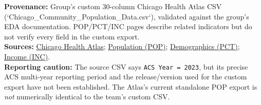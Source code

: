 \documentclass[10pt]{article}
\begin{document}
\begin{center}
  
\end{center}
\vspace{0.35em}
\noindent\begin{minipage}{0.96\linewidth}
\footnotesize
\textbf{Provenance:} Group's custom 30-column Chicago Health Atlas CSV (`Chicago\_Community\_Population\_Data.csv`), validated against the group's EDA documentation. POP/PCT/INC pages describe related indicators but do not verify every field in the custom export.\\[0.3em]
\textbf{Sources:} \href{https://chicagohealthatlas.org/}{Chicago Health Atlas}; \href{https://chicagohealthatlas.org/indicators/POP}{Population (POP)}; \href{https://chicagohealthatlas.org/indicators/PCT}{Demographics (PCT)}; \href{https://chicagohealthatlas.org/indicators/INC}{Income (INC)}.\\[0.3em]
\textbf{Reporting caution:} The source CSV says \texttt{ACS Year = 2023}, but its precise ACS multi-year reporting period and the release/version used for the custom export have not been established. The Atlas's current standalone POP export is \emph{not} numerically identical to the team's custom CSV.
\end{minipage}
\end{document}
